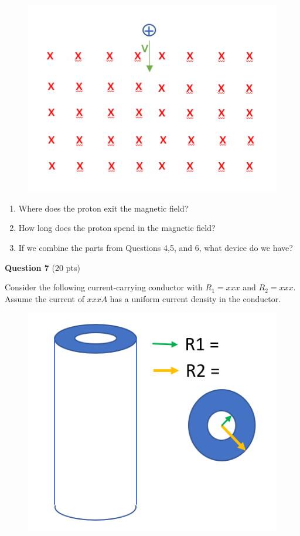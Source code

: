 \documentclass[14pt]{report}
\begin{document}
\begin{figure}[H]
\begin{center}
\includegraphics[scale=0.50]{final_4c.png}
\end{center}
\end{figure}

\begin{enumerate}[label=\Alph*]
\item Where does the proton exit the magnetic field?
\item How long does the proton spend in the magnetic field?
\item If we combine the parts from Questions 4,5, and 6, what device do we have?
\end{enumerate} 

\textbf{Question 7} (20 pts)

Consider the following current-carrying conductor with $R_1 = xxx$ and $R_2 = xxx$. Assume the current of $xxx A$ has a uniform current density in the conductor. 

\begin{figure}[H]
\begin{center}
\includegraphics[scale=0.60]{final_7.png}
\end{center}
\end{figure}
\end{document}
